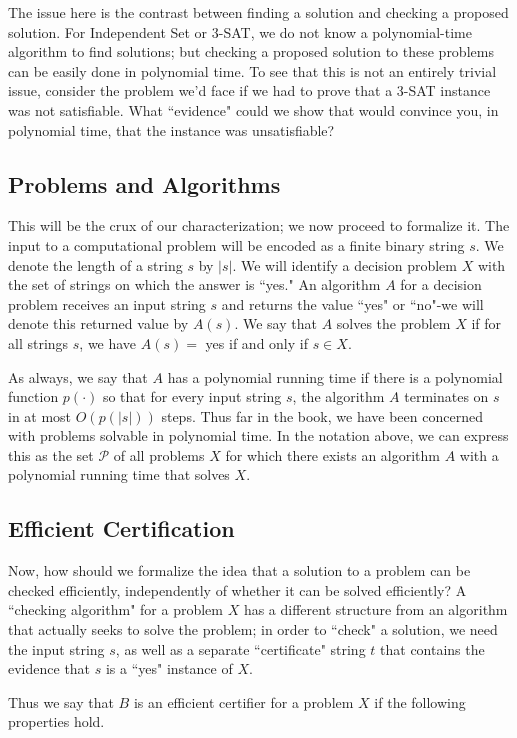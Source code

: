 \documentclass[a4paper, 12pt]{book}
\theoremstyle{dotless}
\begin{document}
The issue here is the contrast between finding a solution and checking a proposed solution. For Independent Set or 3-SAT, we do not know a polynomial-time algorithm to find solutions; but checking a proposed solution to these problems can be easily done in polynomial time. To see that this is not an entirely trivial issue, consider the problem we'd face if we had to prove that a 3-SAT instance was not satisfiable. What ``evidence" could we show that would convince you, in polynomial time, that the instance was unsatisfiable?

\subsection{Problems and Algorithms}
This will be the crux of our characterization; we now proceed to formalize it. The input to a computational problem will be encoded as a finite binary string $s$. We denote the length of a string $s$ by $|s|$. We will identify a decision problem $X$ with the set of strings on which the answer is ``yes." An algorithm $A$ for a decision problem receives an input string $s$ and returns the value ``yes" or ``no"-we will denote this returned value by $A(s)$. We say that $A$ solves the problem $X$ if for all strings $s$, we have $A(s)=$ yes if and only if $s \in X$.

As always, we say that $A$ has a polynomial running time if there is a polynomial function $p(\cdot)$ so that for every input string $s$, the algorithm $A$ terminates on $s$ in at most $O(p(|s|))$ steps. Thus far in the book, we have been concerned with problems solvable in polynomial time. In the notation above, we can express this as the set $\mathcal{P}$ of all problems $X$ for which there exists an algorithm $A$ with a polynomial running time that solves $X$.

\subsection{Efficient Certification}
Now, how should we formalize the idea that a solution to a problem can be checked efficiently, independently of whether it can be solved efficiently? A ``checking algorithm" for a problem $X$ has a different structure from an algorithm that actually seeks to solve the problem; in order to ``check" a solution, we need the input string $s$, as well as a separate ``certificate" string $t$ that contains the evidence that $s$ is a ``yes" instance of $X$.

Thus we say that $B$ is an efficient certifier for a problem $X$ if the following properties hold.
\end{document}
